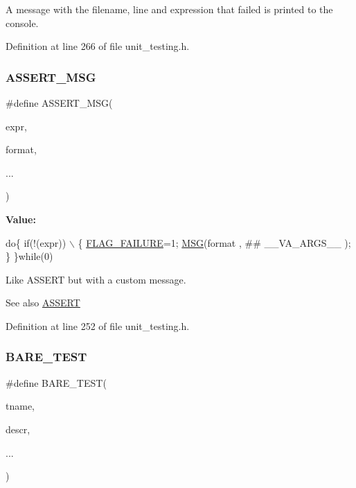 A message with the filename, line and expression that failed is printed to the console. 

Definition at line 266 of file unit\+\_\+testing.\+h.

\mbox{\label{group__Testing_ga9be407f8744aff436633d34c62591cb9}} 
\subsubsection{\texorpdfstring{A\+S\+S\+E\+R\+T\+\_\+\+M\+SG}{ASSERT\_MSG}}
{\footnotesize\ttfamily \#define A\+S\+S\+E\+R\+T\+\_\+\+M\+SG(\begin{DoxyParamCaption}\item[{}]{expr,  }\item[{}]{format,  }\item[{}]{... }\end{DoxyParamCaption})}

{\bfseries Value\+:}
\begin{DoxyCode}
\textcolor{keywordflow}{do}\{ \textcolor{keywordflow}{if}(!(expr)) \(\backslash\)
 \{ \hyperlink{group__Testing_ga35895e417ef253455c9cf365cb66d87c}{FLAG\_FAILURE}=1; \hyperlink{group__Testing_ga2e36933a48fbca44bb782f881ddceb20}{MSG}(format , ##  \_\_VA\_ARGS\_\_ ); \} \}\textcolor{keywordflow}{while}(0)
\end{DoxyCode}


Like A\+S\+S\+E\+RT but with a custom message. 

\begin{DoxySeeAlso}{See also}
\hyperlink{group__Testing_ga28301f76c53b643912da7c538f74e2c6}{A\+S\+S\+E\+RT} 
\end{DoxySeeAlso}


Definition at line 252 of file unit\+\_\+testing.\+h.

\mbox{\label{group__Testing_gadeb59351f026036674baa906f32ccd5c}} 
\subsubsection{\texorpdfstring{B\+A\+R\+E\+\_\+\+T\+E\+ST}{BARE\_TEST}}
{\footnotesize\ttfamily \#define B\+A\+R\+E\+\_\+\+T\+E\+ST(\begin{DoxyParamCaption}\item[{}]{tname,  }\item[{}]{descr,  }\item[{}]{... }\end{DoxyParamCaption})}

